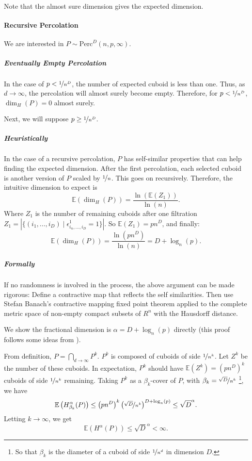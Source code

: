 Note that the almost sure dimension gives the expected dimension.

\paragraph{Recursive Percolation}
We are interested in $P \sim \text{Perc}^D(n,p,\infty)$.

\subparagraph{Eventually Empty Percolation}
In the case of $p < \nicefrac{1}{n^D}$, the number of expected cuboid is less than one.
Thus, as $d \to \infty$, the percolation will almost surely become empty.
Therefore, for $p < \nicefrac{1}{n^D}$, $\dim_H(P) = 0$ almost surely. 

Next, we will suppose $p \geq \nicefrac{1}{n^D}$.

\subparagraph{Heuristically}
In the case of a recursive percolation, $P$ has self-similar properties that can help finding the expected dimension.
After the first percolation, each selected cuboid is another version of $P$ scaled by $\nicefrac{1}{n}$.
This goes on recursively.
Therefore, the intuitive dimension to expect is 
$$\mathbb{E}(\dim_H(P)) = \frac{\ln(\mathbb{E}(Z_1))}{\ln(n)}.$$
Where $Z_1$ is the number of remaining cuboids after one filtration $Z_1 = \left| \{ (i_1,\dots,i_D) \mid \epsilon_{i_n,\dots,i_D}^1 = 1 \} \right|$.
So $\mathbb{E}(Z_1) = p n^D$, and finally:
$$\mathbb{E}(\dim_H(P)) = \frac{\ln(p n^D)}{\ln(n)} = D + \log_n(p).$$

\subparagraph{Formally}
If no randomness is involved in the process, the above argument can be made rigorous:
Define a contractive map that reflects the self similarities.
Then use Stefan Banach's contractive mapping fixed point theorem applied to the complete metric space of non-empty compact subsets of $R^n$ with the Hausdorff distance.

We show the fractional dimension is $\alpha = D + \log_n(p)$ directly (this proof follows some ideas from \cite[p. 265-273, section 15]{Falconer_1990}).

From definition, $P = \bigcap_{d \to \infty} P^k$.
$P^k$ is composed of cuboids of side $\nicefrac{1}{n^k}$.
Let $Z^k$ be the number of these cuboids.
In expectation, $P^k$ should have $\mathbb{E}(Z^k) = \left( p n^D \right)^k$ cuboids of side $\nicefrac{1}{n^k}$ remaining.
Taking $P^k$ as a $\beta_k$-cover of $P$, with $\beta_k = \nicefrac{\sqrt{D}}{n^k}$
\footnote{So that $\beta_k$ is the diameter of a cuboid of side $\nicefrac{1}{n^d}$ in dimension $D$.}, we have
$$\mathbb{E}\left( H_{\beta_k}^{\alpha}(P) \right) \leq \left( p n^D \right)^k \left( \nicefrac{\sqrt{D}}{n^k} \right)^{D + \log_n(p)} \leq \sqrt{D}^{\alpha}.$$
Letting $k \to \infty$, we get
$$\mathbb{E} \left( H^{\alpha}(P) \right) \leq \sqrt{D}^{\alpha} < \infty.$$

